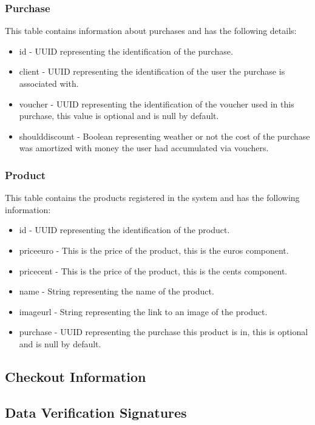 \documentclass[12pt]{article}
\begin{document}
\subsubsection{Purchase}
This table contains information about purchases and has the following details:
\begin{itemize}
    \item id - UUID representing the identification of the purchase.
	\item client - UUID representing the identification of the user the purchase is associated with.
	\item voucher - UUID representing the identification of the voucher used in this purchase, this value is optional and is null by default.
	\item should\textunderscore discount - Boolean representing weather or not the cost of the purchase was amortized with money the user had accumulated via vouchers.
\end{itemize}


\subsubsection{Product}
This table contains the products registered in the system and has the following information:
\begin{itemize}
    \item id - UUID representing the identification of the product.
	\item price\textunderscore euro - This is the price of the product, this is the euros component.
	\item price\textunderscore cent - This is the price of the product, this is the cents component.
	\item name - String representing the name of the product.
	\item image\textunderscore url - String representing the link to an image of the product.
	\item purchase - UUID representing the purchase this product is in, this is optional and is null by default.
\end{itemize}


\subsection{Checkout Information}

\subsection{Data Verification Signatures}
\end{document}
